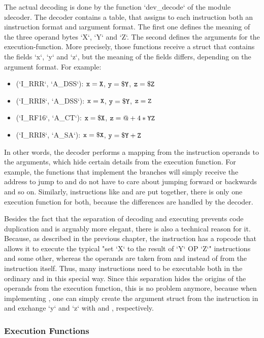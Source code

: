 The actual decoding is done by the function `dev_decode` of the module \i{decoder}. The decoder contains a table, that assigns to each instruction both an \i{instruction format} and \i{argument format}. The first one defines the meaning of the three operand bytes `X`, `Y` and `Z`. The second defines the arguments for the execution-function. More precisely, those functions receive a struct that contains the fields `x`, `y` and `z`, but the meaning of the fields differs, depending on the argument format. For example:
\begin{itemize}
	\item {} (`I_RRR`, `A_DSS`): ${\tt x}={\tt X}$, ${\tt y}={\tt \$Y}$, ${\tt z}={\tt \$Z}$
	\item {} (`I_RRI8`, `A_DSS`): ${\tt x}={\tt X}$, ${\tt y}={\tt \$Y}$, ${\tt z}={\tt Z}$
	\item {} (`I_RF16`, `A_CT`): ${\tt x}={\tt \$X}$, ${\tt z}=@ + 4*{\tt YZ}$
	\item {} (`I_RRI8`, `A_SA`): ${\tt x}={\tt \$X}$, ${\tt y}={\tt \$Y} + {\tt Z}$
\end{itemize}
In other words, the decoder performs a mapping from the instruction operands to the arguments, which hide certain details from the execution function. For example, the functions that implement the branches will simply receive the address to jump to and do not have to care about jumping forward or backwards and so on. Similarly, instructions like  and  are put together, \ie there is only one execution function for both, because the differences are handled by the decoder.

Besides the fact that the separation of decoding and executing prevents code duplication and is arguably more elegant, there is also a technical reason for it. Because, as described in the previous chapter, the instruction  has a ropcode that allows it to execute the typical "set `X` to the result of `Y` OP `Z`" instructions and some other, whereas the operands are taken from  and  instead of from the instruction itself. Thus, many instructions need to be executable both in the ordinary and in this special way. Since this separation hides the origins of the operands from the execution function, this is no problem anymore, because when implementing , one can simply create the argument struct from the instruction in  and exchange `y` and `z` with  and , respectively.

\subsubsection{Execution Functions}

